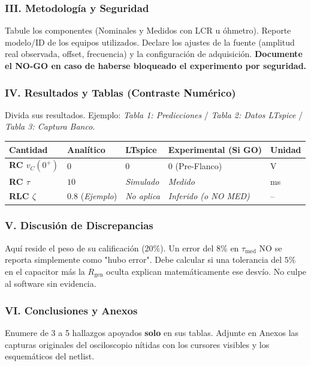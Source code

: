 \documentclass[11pt, a4paper]{article}
\begin{document}
\subsubsection*{III. Metodología y Seguridad}
Tabule los componentes (Nominales y Medidos con LCR u óhmetro). Reporte modelo/ID de los equipos utilizados. Declare los ajustes de la fuente (amplitud real observada, offset, frecuencia) y la configuración de adquisición. \textbf{Documente el NO-GO en caso de haberse bloqueado el experimento por seguridad.}

\subsubsection*{IV. Resultados y Tablas (Contraste Numérico)}
Divida sus resultados. Ejemplo: \textit{Tabla 1: Predicciones} / \textit{Tabla 2: Datos LTspice} / \textit{Tabla 3: Captura Banco}.

\vspace{0.15cm}
\renewcommand{\arraystretch}{1.3}
\noindent
\begin{tabularx}{\textwidth}{
  >{\bfseries\RaggedRight\hsize=1.1\hsize}X 
  >{\RaggedRight\arraybackslash\hsize=1.0\hsize}X 
  >{\RaggedRight\arraybackslash\hsize=1.0\hsize}X 
  >{\RaggedRight\arraybackslash\hsize=1.1\hsize}X 
  >{\RaggedRight\arraybackslash\hsize=0.8\hsize}X}
\toprule
\textbf{Cantidad} & \textbf{Analítico} & \textbf{LTspice} & \textbf{Experimental (Si GO)} & \textbf{Unidad} \\
\midrule
RC $v_C(0^+)$ & $0$ & $0$ & $0$ (Pre-Flanco) & V \\
RC $\tau$     & $10$ & \textit{Simulado} & \textit{Medido} & ms \\
RLC $\zeta$   & $0.8$ (\textit{Ejemplo}) & \textit{No aplica} & \textit{Inferido (o NO MED)} & -- \\
\bottomrule
\end{tabularx}

\subsubsection*{V. Discusión de Discrepancias}
Aquí reside el peso de su calificación (20\%). Un error del 8\% en $\tau_{\text{med}}$ NO se reporta simplemente como "hubo error". Debe calcular si una tolerancia del $5\%$ en el capacitor más la $R_{\text{gen}}$ oculta explican matemáticamente ese desvío. No culpe al software sin evidencia.

\subsubsection*{VI. Conclusiones y Anexos}
Enumere de 3 a 5 hallazgos apoyados \textbf{solo} en sus tablas. Adjunte en Anexos las capturas originales del osciloscopio nítidas con los cursores visibles y los esquemáticos del netlist.
\end{document}
